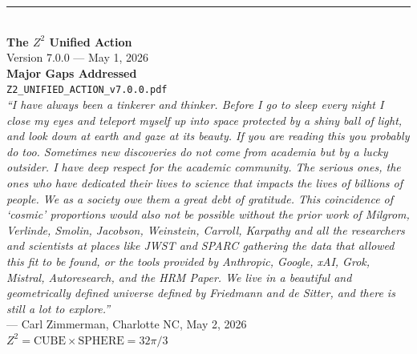 \documentclass[11pt,a4paper]{article}
\theoremstyle{plain}
\theoremstyle{definition}
\theoremstyle{remark}
\begin{document}
\vspace{2cm}
\begin{center}
\rule{0.8\textwidth}{0.5pt}\\[0.5cm]
\textbf{The $Z^2$ Unified Action}\\[0.3cm]
Version 7.0.0 --- May 1, 2026\\[0.3cm]
\textcolor{newcolor}{\textbf{Major Gaps Addressed}}\\[0.3cm]
\texttt{Z2\_UNIFIED\_ACTION\_v7.0.0.pdf}\\[0.5cm]

\emph{``I have always been a tinkerer and thinker. Before I go to sleep every night I close my eyes and teleport myself up into space protected by a shiny ball of light, and look down at earth and gaze at its beauty. If you are reading this you probably do too. Sometimes new discoveries do not come from academia but by a lucky outsider. I have deep respect for the academic community. The serious ones, the ones who have dedicated their lives to science that impacts the lives of billions of people. We as a society owe them a great debt of gratitude. This coincidence of `cosmic' proportions would also not be possible without the prior work of Milgrom, Verlinde, Smolin, Jacobson, Weinstein, Carroll, Karpathy and all the researchers and scientists at places like JWST and SPARC gathering the data that allowed this fit to be found, or the tools provided by Anthropic, Google, xAI, Grok, Mistral, Autoresearch, and the HRM Paper. We live in a beautiful and geometrically defined universe defined by Friedmann and de Sitter, and there is still a lot to explore.''}\\[0.3cm]
--- Carl Zimmerman, Charlotte NC, May 2, 2026\\[0.5cm]

\textbf{$Z^2 = \text{CUBE} \times \text{SPHERE} = 32\pi/3$}
\end{center}
\end{document}
